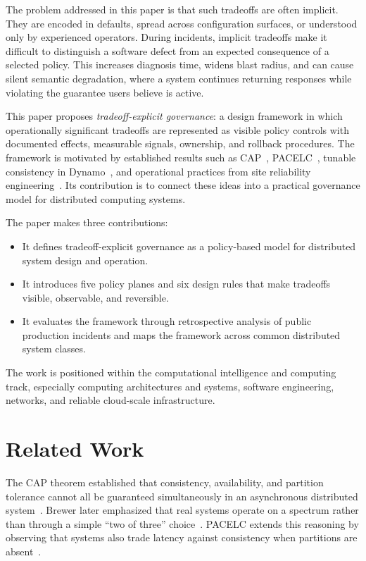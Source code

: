 \documentclass[conference]{IEEEtran}
\begin{document}
The problem addressed in this paper is that such tradeoffs are often implicit. They are encoded in defaults, spread across configuration surfaces, or understood only by experienced operators. During incidents, implicit tradeoffs make it difficult to distinguish a software defect from an expected consequence of a selected policy. This increases diagnosis time, widens blast radius, and can cause silent semantic degradation, where a system continues returning responses while violating the guarantee users believe is active.

This paper proposes \textit{tradeoff-explicit governance}: a design framework in which operationally significant tradeoffs are represented as visible policy controls with documented effects, measurable signals, ownership, and rollback procedures. The framework is motivated by established results such as CAP~\cite{brewer2000cap,gilbert2002brewer}, PACELC~\cite{pacelc}, tunable consistency in Dynamo~\cite{dynamo}, and operational practices from site reliability engineering~\cite{sre}. Its contribution is to connect these ideas into a practical governance model for distributed computing systems.

The paper makes three contributions:
\begin{itemize}
    \item It defines tradeoff-explicit governance as a policy-based model for distributed system design and operation.
    \item It introduces five policy planes and six design rules that make tradeoffs visible, observable, and reversible.
    \item It evaluates the framework through retrospective analysis of public production incidents and maps the framework across common distributed system classes.
\end{itemize}

The work is positioned within the computational intelligence and computing track, especially computing architectures and systems, software engineering, networks, and reliable cloud-scale infrastructure.

\section{Related Work}

The CAP theorem established that consistency, availability, and partition tolerance cannot all be guaranteed simultaneously in an asynchronous distributed system~\cite{brewer2000cap,gilbert2002brewer}. Brewer later emphasized that real systems operate on a spectrum rather than through a simple ``two of three'' choice~\cite{brewer2012cap}. PACELC extends this reasoning by observing that systems also trade latency against consistency when partitions are absent~\cite{pacelc}.
\end{document}
